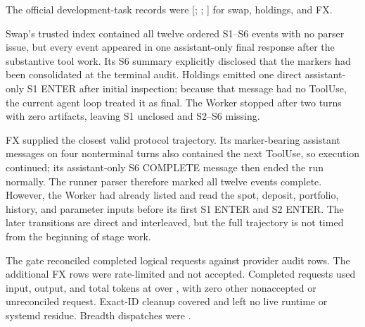  The
official development-task records were
[\SsixCoreVthreeGateSwapOfficial{};
\SsixCoreVthreeGateHoldingsOfficial{};
\SsixCoreVthreeGateFxOfficial{}] for swap, holdings, and FX.

Swap's trusted index contained all twelve ordered S1--S6 events with no parser
issue, but every event appeared in one assistant-only final response after the
substantive tool work. Its S6 summary explicitly disclosed that the markers had
been consolidated at the terminal audit. Holdings emitted one direct
assistant-only S1 ENTER after initial inspection; because that message had no
ToolUse, the current agent loop treated it as final. The Worker stopped after
two turns with zero artifacts, leaving S1 unclosed and S2--S6 missing.

FX supplied the closest valid protocol trajectory. Its marker-bearing
assistant messages on four nonterminal turns also contained the next ToolUse,
so execution continued; its assistant-only S6 COMPLETE message then ended the
run normally. The runner parser therefore marked all twelve events complete.
However, the Worker had already listed and read the spot, deposit, portfolio,
history, and parameter inputs before its first S1 ENTER and S2 ENTER. The later
transitions are direct and interleaved, but the full trajectory is not timed
from the beginning of stage work.

The gate reconciled \SsixCoreVthreeGateLogicalRequests{} completed logical
requests against \SsixCoreVthreeGateAuditRows{} provider audit rows. The
additional \SsixCoreVthreeGateRateLimits{} FX rows were rate-limited and not
accepted. Completed requests used \SsixCoreVthreeGateInputTokens{} input,
\SsixCoreVthreeGateOutputTokens{} output, and
\SsixCoreVthreeGateTokens{} total tokens at
\SsixCoreVthreeGateCost{} over \SsixCoreVthreeGateWall{}, with zero other
nonaccepted or unreconciled request. Exact-ID cleanup covered
\SsixCoreVthreeGateCleanup{} and left no live runtime or systemd residue.
Breadth dispatches were \SsixCoreVthreeGateBreadthDispatches{}.


